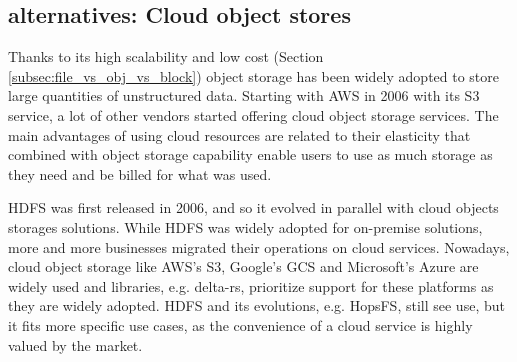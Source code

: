 \subsection{ alternatives: Cloud object stores}

Thanks to its high scalability and low cost (Section \ref{subsec:file_vs_obj_vs_block}) object storage has been widely adopted to store large quantities of unstructured data. Starting with \gls{AWS} in 2006 with its S3 service, a lot of other vendors started offering cloud object storage services. The main advantages of using cloud resources are related to their elasticity that combined with object storage capability enable users to use as much storage as they need and be billed for what was used. 

\gls{HDFS} was first released in 2006, and so it evolved in parallel with cloud objects storages solutions. While \gls{HDFS} was widely adopted for on-premise solutions, more and more businesses migrated their operations on cloud services. Nowadays, cloud object storage like \gls{AWS}'s S3, Google's \gls{GCS} and Microsoft's Azure are widely used and libraries, e.g. delta-rs, prioritize support for these platforms as they are widely adopted. \gls{HDFS} and its evolutions, e.g. \gls{HopsFS}, still see use, but it fits more specific use cases, as the convenience of a cloud service is highly valued by the market.